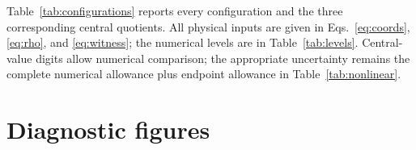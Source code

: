 Table~\ref{tab:configurations} reports every configuration and the three corresponding central quotients. All physical inputs are given in Eqs.~\eqref{eq:coords}, \eqref{eq:rho}, and \eqref{eq:witness}; the numerical levels are in Table~\ref{tab:levels}. Central-value digits allow numerical comparison; the appropriate uncertainty remains the complete numerical allowance plus endpoint allowance in Table~\ref{tab:nonlinear}.


\FloatBarrier
\section{Diagnostic figures}

